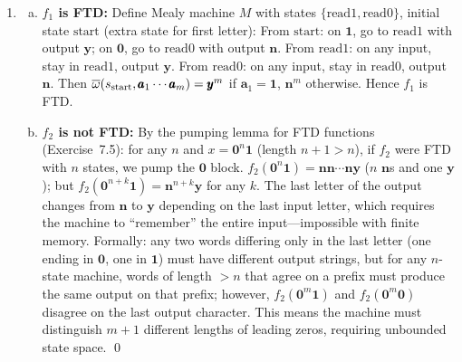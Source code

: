 \begin{enumerate}[{7.}1.]
\begin{enumerate}[(a)]
  \item $M/_{E_M}\equiv M$: Both produce the same output for all input strings (from part~(a)).

  \item $M/_{E_M}$ is reduced: Suppose $[s]_{E_M} E_{M/E_M} [t]_{E_M}$.  Then for all $y$, $\OBAR_{E_M}([s]_{E_M},y)=\OBAR_{E_M}([t]_{E_M},y)$, which means $\OBAR(s,y)=\OBAR(t,y)$ for all $y$, so $s E_M t$, so $[s]_{E_M}=[t]_{E_M}$.

  \item If $M$ connected, $M/_{E_M}$ connected: Every equivalence class $[t]_{E_M}$ is reachable in $M/_{E_M}$ because $t$ is reachable in $M$ (via some $x$), and $[\DBAR(s_0,x)]_{E_M}=\DBAR_{E_M}([s_0]_{E_M},x)$.
\end{enumerate}

\item \begin{enumerate}[(a)]
  \item \textbf{$f_1$ is FTD:}  Define Mealy machine $M$ with states $\{\text{read1},\text{read0}\}$, initial state $\text{start}$ (extra state for first letter):
  From $\text{start}$: on $\pmb{1}$, go to $\text{read1}$ with output $\pmb{y}$; on $\pmb{0}$, go to $\text{read0}$ with output $\pmb{n}$.
  From $\text{read1}$: on any input, stay in $\text{read1}$, output $\pmb{y}$.
  From $\text{read0}$: on any input, stay in $\text{read0}$, output $\pmb{n}$.
  Then $\overline{\omega}(s_{\text{start}},\pmb{a}_1\cdots\pmb{a}_m)=\pmb{y}^m$ if $\pmb{a}_1=\pmb{1}$, $\pmb{n}^m$ otherwise.  Hence $f_1$ is FTD.

  \item \textbf{$f_2$ is not FTD:}  By the pumping lemma for FTD functions (Exercise~7.5): for any $n$ and $x=\pmb{0}^n\pmb{1}$ (length $n+1>n$), if $f_2$ were FTD with $n$ states, we pump the $\pmb{0}$ block.  $f_2(\pmb{0}^n\pmb{1})=\pmb{nn}\cdots\pmb{ny}$ ($n$ $\pmb{n}$s and one $\pmb{y}$); but $f_2(\pmb{0}^{n+k}\pmb{1})=\pmb{n}^{n+k}\pmb{y}$ for any $k$.  The last letter of the output changes from $\pmb{n}$ to $\pmb{y}$ depending on the last input letter, which requires the machine to ``remember'' the entire input---impossible with finite memory.  Formally: any two words differing only in the last letter (one ending in $\pmb{0}$, one in $\pmb{1}$) must have different output strings, but for any $n$-state machine, words of length $>n$ that agree on a prefix must produce the same output on that prefix; however, $f_2(\pmb{0}^m\pmb{1})$ and $f_2(\pmb{0}^m\pmb{0})$ disagree on the last output character.  This means the machine must distinguish $m+1$ different lengths of leading zeros, requiring unbounded state space. \qed
\end{enumerate}


\end{enumerate}
